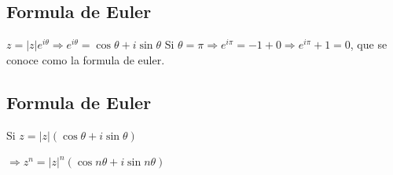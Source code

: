 \documentclass[12pt]{article}
\begin{document}
\subsection*{Formula de Euler}
\begin{center}
    $z=|z|e^{i\theta}\Rightarrow e^{i\theta}=\cos{\theta}+i\sin{\theta}$\newline
    Si $\theta=\pi\Rightarrow e^{i\pi}=-1+0\Rightarrow e^{i\pi}+1=0$, que se conoce como la formula de euler.
\end{center}
\subsection*{Formula de Euler}
\noindent Si $z=|z|(\cos{\theta}+i\sin{\theta})$
\begin{center}
    $\Rightarrow z^n=|z|^n(\cos{n\theta}+i\sin{n\theta})$
\end{center}
\end{document}
